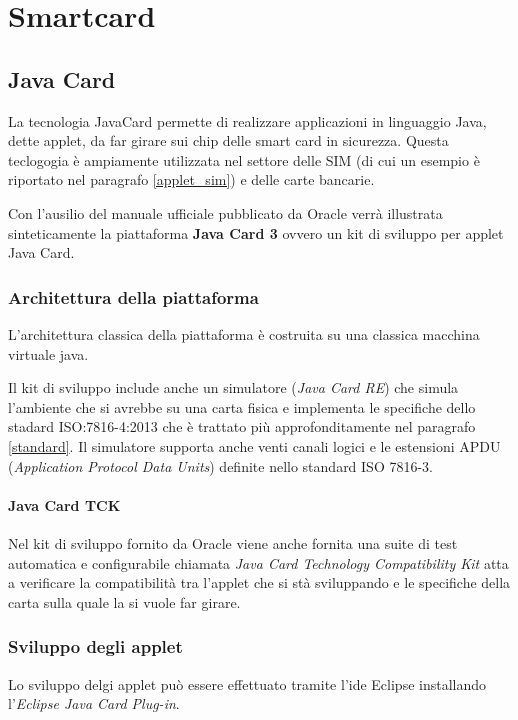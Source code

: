 \chapter{Smartcard}
\label{chapter2}

\section{Java Card}
\label{java_card}
La tecnologia JavaCard permette di realizzare applicazioni in linguaggio Java, dette applet, da far girare sui chip delle smart card in sicurezza. Questa teclogogia è ampiamente utilizzata nel settore delle SIM (di cui un esempio è riportato nel paragrafo \ref{applet_sim}) e delle carte bancarie.
\cite{Wiki_java}

Con l'ausilio del manuale ufficiale pubblicato da Oracle \cite{javacard3platform} verrà illustrata sinteticamente la piattaforma \textbf{Java Card 3} ovvero un kit di sviluppo per applet Java Card.
\subsection{Architettura della piattaforma}
L'architettura classica della piattaforma è costruita su una classica macchina virtuale java.

Il kit di sviluppo include anche un simulatore (\textit{Java Card RE}) che simula l'ambiente che si avrebbe su una carta fisica e implementa le specifiche dello stadard ISO:7816-4:2013 che è trattato più approfonditamente nel paragrafo \ref{standard}. Il simulatore supporta anche venti canali logici e le estensioni APDU (\textit{Application Protocol Data Units}) definite nello standard ISO 7816-3.
\subsubsection{Java Card TCK}
Nel kit di sviluppo fornito da Oracle viene anche fornita una suite di test automatica e configurabile chiamata \textit{Java Card Technology Compatibility Kit} atta a verificare la compatibilità tra l'applet che si stà sviluppando e le specifiche della carta sulla quale la si vuole far girare.

\subsection{Sviluppo degli applet}
Lo sviluppo delgi applet può essere effettuato tramite l'ide Eclipse installando l'\textit{Eclipse Java Card Plug-in}.

